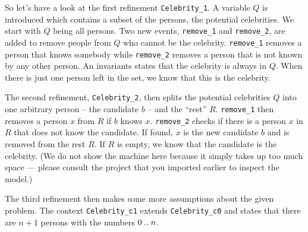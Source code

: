 
So let's have a look at the first refinement \texttt{Celebrity\_1}. 
A variable $Q$ is introduced which contains a subset of the persons, the potential celebrities.
We start with $Q$ being all persons.
Two new events,  \texttt{remove\_1} and \texttt{remove\_2}, are added to remove people
  from $Q$ who cannot be the celebrity.
\texttt{remove\_1} removes a person that knows somebody while \texttt{remove\_2}
  removes a person that is not known by any other person.
An invariants states that the celebrity is always in $Q$.
When there is just one person left in the set, we know that this is the celebrity.

The second refinement, \texttt{Celebrity\_2}, then splits the
  potential celebrities $Q$ into one arbitrary person -- the candidate $b$ --
  and the ``rest'' $R$.
\texttt{remove\_1} then removes a person $x$ from $R$ if $b$ knows $x$.
\texttt{remove\_2} checks if there is a person $x$ in $R$ that does not know the candidate.
If found, $x$ is the new candidate $b$ and is removed from the rest $R$.
If $R$ is empty, we know that the candidate is the celebrity. (We do not show the machine here because it simply takes up too much space --- please consult the project that you imported earlier to inspect the model.)

The third refinement then makes some more assumptions about the given problem.
The context \texttt{Celebrity\_c1} extends \texttt{Celebrity\_c0} and states that
  there are $n+1$ persons with the numbers $0\mathbin{.\mkern1mu.} n$.

